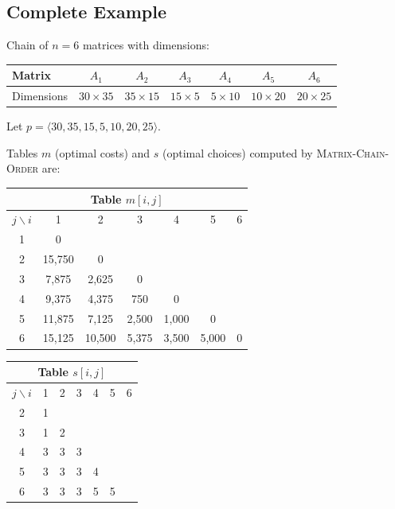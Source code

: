 \subsection{Complete Example}

Chain of $n = 6$ matrices with dimensions:

\begin{center}
\renewcommand{\arraystretch}{1.2}
\begin{tabular}{lcccccc}
\toprule
Matrix      & $A_1$           & $A_2$           & $A_3$          & $A_4$         & $A_5$           & $A_6$ \\
\midrule
Dimensions & $30\times35$ & $35\times15$ & $15\times5$ & $5\times10$ & $10\times20$ & $20\times25$ \\
\bottomrule
\end{tabular}
\end{center}

\noindent Let $p = \langle 30, 35, 15, 5, 10, 20, 25 \rangle$.

Tables $m$ (optimal costs) and $s$ (optimal choices) computed by
\textsc{Matrix-Chain-Order} are:

\begin{center}
\renewcommand{\arraystretch}{1.4}
\begin{tabular}{c|cccccc}
\multicolumn{7}{c}{\textbf{Table $m[i,j]$}} \\
\hline
$j \backslash i$ & 1 & 2 & 3 & 4 & 5 & 6 \\
\hline
1 & 0 & & & & & \\
2 & 15,750 & 0 & & & & \\
3 & 7,875 & 2,625 & 0 & & & \\
4 & 9,375 & 4,375 & 750 & 0 & & \\
5 & 11,875 & 7,125 & 2,500 & 1,000 & 0 & \\
6 & 15,125 & 10,500 & 5,375 & 3,500 & 5,000 & 0 \\
\hline
\end{tabular}
\qquad
\begin{tabular}{c|cccccc}
\multicolumn{7}{c}{\textbf{Table $s[i,j]$}} \\
\hline
$j \backslash i$ & 1 & 2 & 3 & 4 & 5 & 6 \\
\hline
2 & 1 & & & & & \\
3 & 1 & 2 & & & & \\
4 & 3 & 3 & 3 & & & \\
5 & 3 & 3 & 3 & 4 & & \\
6 & 3 & 3 & 3 & 5 & 5 & \\
\hline
\end{tabular}
\end{center}

